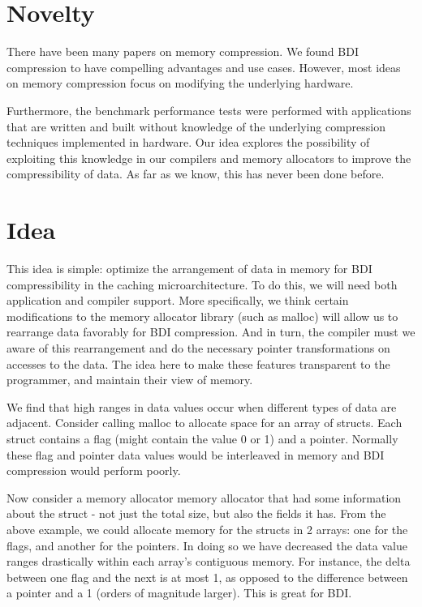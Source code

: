 \documentclass[pageno]{jpaper}
\begin{document}
\section{Novelty}
There have been many papers on memory compression. We found BDI compression to have compelling advantages and use cases. However, most ideas on memory compression focus on modifying the underlying hardware.

Furthermore, the benchmark performance tests were performed with applications that are written and built without knowledge of the underlying compression techniques implemented in hardware. Our idea explores the possibility of exploiting this knowledge in our compilers and memory allocators to improve the compressibility of data. As far as we know, this has never been done before.

\section{Idea}
This idea is simple: optimize the arrangement of data in memory for BDI compressibility in the caching microarchitecture. To do this, we will need both application and compiler support. More specifically, we think certain modifications to the memory allocator library (such as malloc) will allow us to rearrange data favorably for BDI compression. And in turn, the compiler must we aware of this rearrangement and do the necessary pointer transformations on accesses to the data. The idea here to make these features transparent to the programmer, and maintain their view of memory.

We find that high ranges in data values occur when different types of data are adjacent. Consider calling malloc to allocate space for an array of structs. Each struct contains a flag (might contain the value 0 or 1) and a pointer. Normally these flag and pointer data values would be interleaved in memory and BDI compression would perform poorly.

Now consider a memory allocator memory allocator that had some information about the struct - not just the total size, but also the fields it has. From the above example, we could allocate memory for the structs in 2 arrays: one for the flags, and another for the pointers. In doing so we have decreased the data value ranges drastically within each array's contiguous memory. For instance, the delta between one flag and the next is at most 1, as opposed to the difference between a pointer and a 1 (orders of magnitude larger). This is great for BDI.
\end{document}
